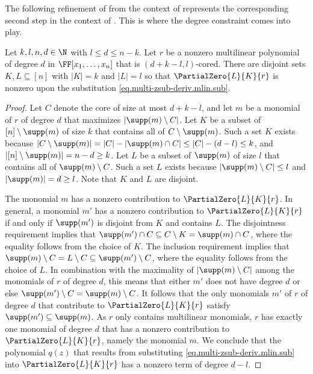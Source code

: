 \documentclass{toc}
\begin{document}
The following refinement of  from the context of  represents the corresponding second step in the context of . This is where the degree constraint comes into play.

\begin{lemma}\label{lemma.rfe-hits-multiaffine-coreform}
Let \(k,l,n,d \in\N\) with $l \le d \le n-k$. 
Let \(r\) be a nonzero multilinear polynomial of degree $d$ in $\FF[x_1,\dots,x_n]$ that is \((d+k-l, l)\)-cored.
There are disjoint sets \(K,L\subseteq [n]\) with \(|K|=k\) and
\(|L|=l\) so that \(\PartialZero{L}{K}{r}\) is nonzero upon the substitution \eqref{eq.multi-zsub-deriv.mlin.sub}.
\end{lemma}
\begin{proof}
  Let $C$ denote the core of size at most $d+k-l$, and let $m$ be a monomial of $r$ of degree $d$ that maximizes $|\supp(m) \setminus C|$.
  Let $K$ be a subset of $[n]\setminus \supp(m)$ of size $k$ that 
  contains all of $C \setminus \supp(m)$.
  Such a set $K$ exists because $|C \setminus \supp(m)| = |C| - |\supp(m) \cap C| \le |C| - (d-l) \le k$, and $|[n] \setminus \supp(m)| = n-d \ge k$. 
  Let $L$ be a subset of $\supp(m)$ of size $l$ that contains all of $\supp(m) \setminus C$.
  Such a set $L$ exists because $|\supp(m) \setminus C| \le l$ and $|\supp(m)| = d \ge l$. Note that $K$ and $L$ are disjoint. 
  
  The monomial $m$ has a nonzero contribution to $\PartialZero{L}{K}{r}$. In general, a monomial $m'$ has a nonzero contribution to $\PartialZero{L}{K}{r}$ if and only if $\supp(m')$ is disjoint from $K$ and contains $L$. The disjointness requirement implies that $\supp(m') \cap C \subseteq C \setminus K = \supp(m) \cap C$, where the  equality follows from the choice of $K$. The inclusion requirement implies that $\supp(m) \setminus C = L \setminus C \subseteq \supp(m') \setminus C$, where the equality follows from the choice of $L$. In combination with the maximality of $|\supp(m) \setminus C|$ among the monomials of $r$ of degree $d$, this means that either $m'$ does  not have degree $d$ or else $\supp(m')\setminus C = \supp(m) \setminus C$. It follows that the only monomials $m'$ of $r$ of degree $d$ that contribute to $\PartialZero{L}{K}{r}$ satisfy $\supp(m') \subseteq \supp(m)$. As $r$ only contains multilinear monomials, $r$ has exactly one monomial of degree $d$ that has a nonzero contribution to $\PartialZero{L}{K}{r}$, namely the monomial $m$. We conclude that the polynomial $q(z)$ that results from  substituting \eqref{eq.multi-zsub-deriv.mlin.sub} into 
  \(\PartialZero{L}{K}{r}\) has a nonzero term of degree $d-l$.
\end{proof}
\end{document}
